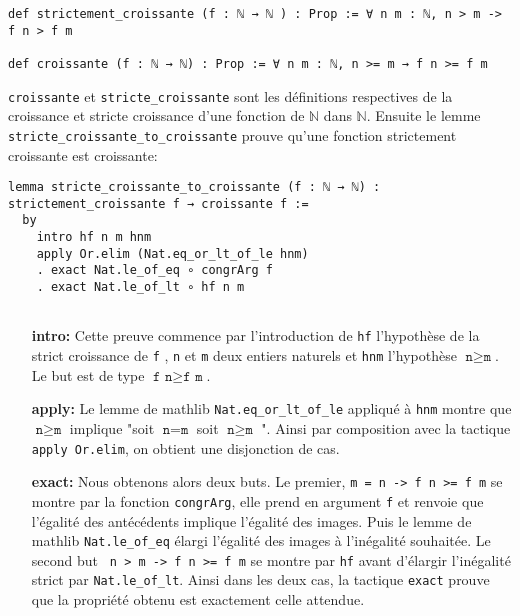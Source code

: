 \documentclass[a4paper, 12pt]{article}
\newcommand{\lean}[1]{\texttt{#1}}
\begin{document}
\begin{verbatim}
def strictement_croissante (f : ℕ → ℕ ) : Prop := ∀ n m : ℕ, n > m -> f n > f m

def croissante (f : ℕ → ℕ) : Prop := ∀ n m : ℕ, n >= m → f n >= f m

\end{verbatim}

\lean{croissante} et \lean{stricte_croissante} sont les définitions respectives de la croissance et stricte croissance d'une fonction de $\mathbb{N}$ dans $\mathbb{N}$. Ensuite le lemme \lean{stricte_croissante_to_croissante} prouve qu'une fonction strictement croissante est croissante:

\begin{verbatim}
lemma stricte_croissante_to_croissante (f : ℕ → ℕ) : strictement_croissante f → croissante f :=
  by
    intro hf n m hnm
    apply Or.elim (Nat.eq_or_lt_of_le hnm)
    . exact Nat.le_of_eq ∘ congrArg f
    . exact Nat.le_of_lt ∘ hf n m
    
\end{verbatim}


\begin{itemize} [  align=left,  itemsep=20pt ]
    \item[\textbf{intro:}] Cette preuve commence par l'introduction de \lean{hf} l'hypothèse de la strict croissance de \lean{f} , \lean{n} et \lean{m} deux entiers naturels et
    \lean{hnm} l'hypothèse $ \lean{n} \geq \lean{m} $. Le but est de type $ \lean{f n} \geq \lean{f m} $. 

    \item[\textbf{apply:}] Le lemme de mathlib \lean{Nat.eq_or_lt_of_le} appliqué à \lean{hnm} montre que $ \lean{n} \geq \lean{m} $ implique "soit $ \lean{n} = \lean{m} $ soit $
    \lean{n} \geq \lean{m} $ ". Ainsi par composition avec la tactique \lean{apply Or.elim}, on obtient une disjonction de cas.

    \item[\textbf{exact:}] Nous obtenons alors deux buts. Le premier, \lean{m = n -> f n >=  f m}  se montre par la fonction \lean{congrArg}, elle prend en argument \lean{f} et renvoie
    que l'égalité des antécédents implique l'égalité des images.  Puis le lemme de mathlib \lean{Nat.le_of_eq} élargi l'égalité des images à l'inégalité souhaitée. Le second but \lean{
    n > m -> f n >= f m} se montre par \lean{hf} avant d'élargir l'inégalité strict par \lean{Nat.le_of_lt}. Ainsi dans les deux cas, la tactique \lean{exact} prouve que la propriété
    obtenu est exactement celle attendue.

    
    
\end{itemize}
\end{document}
